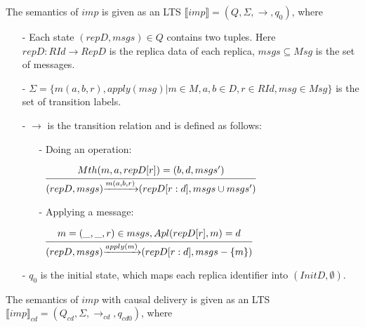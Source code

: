 The semantics of $imp$ is given as an LTS $\llbracket imp \rrbracket = (Q,\Sigma,\rightarrow,q_0)$, where

\begin{itemize}
\setlength{\itemsep}{0.5pt}
\item[-] Each state $(repD,msgs) \in Q$ contains two tuples. Here $repD: RId \rightarrow RepD$ is the replica data of each replica, $msgs \subseteq Msg$ is the set of messages. 

\item[-] $\Sigma = \{ m(a,b,r), apply(msg) \vert m \in M, a,b \in D, r \in RId, msg \in Msg \}$ is the set of transition labels. 

\item[-] $\rightarrow$ is the transition relation and is defined as follows: 

    \begin{itemize}
    \setlength{\itemsep}{0.5pt}
    \item[-] Doing an operation: 
    
    $\begin{array}{l c} \bigfrac{ Mth(m,a,repD[r]) = (b,d,msgs') } {(repD,msgs) {\xrightarrow{m(a,b,r)}} (repD[r:d],msgs \cup msgs')} \end{array}$
    
    \item[-] Applying a message: 

    $\begin{array}{l c} \bigfrac{ m = (\_,\_,r) \in msgs,Apl(repD[r],m) = d } {(repD,msgs) {\xrightarrow{apply(m)}} (repD[r:d],msgs - \{ m \} )} \end{array}$ 
    \end{itemize} 

\item[-] $q_0$ is the initial state, which maps each replica identifier into $(InitD,\emptyset)$. 
\end{itemize} 

The semantics of $imp$ with causal delivery is given as an LTS $\llbracket imp \rrbracket_{cd} = (Q_{cd},\Sigma,\rightarrow_{cd},q_{cd0})$, where 

